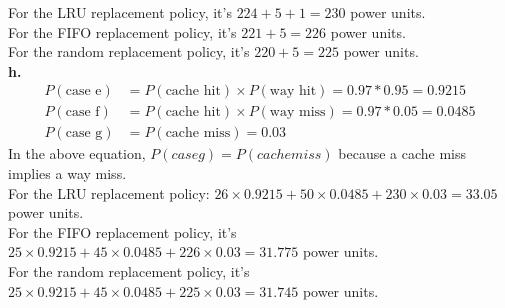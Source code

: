 \documentclass{article}
\begin{document}
\indent For the LRU replacement policy, it's $224+5+1=230$ power units.\\

\indent For the FIFO replacement policy, it's $221+5=226$ power units.\\

\indent For the random replacement policy, it's $220+5=225$ power units.\\

\textbf{h.}\\
\begin{align*}
  P(\text{case e}) &= P(\text{cache hit})\times P(\text{way hit})=0.97*0.95=0.9215\\
  P(\text{case f}) &= P(\text{cache hit})\times P(\text{way miss})=0.97*0.05=0.0485\\
  P(\text{case g}) &= P(\text{cache miss})=0.03
\end{align*}
In the above equation, $P(case g) = P(cache miss)$ because a cache miss implies a way miss.\\
\indent For the LRU replacement policy: $26\times 0.9215+50\times 0.0485+230\times 0.03=33.05$ power units.\\

\indent For the FIFO replacement policy, it's $25\times 0.9215+45\times 0.0485+226\times 0.03=31.775$ power units.\\

\indent For the random replacement policy, it's $25\times 0.9215+45\times 0.0485+225\times 0.03=31.745$ power units.\\
\end{document}
